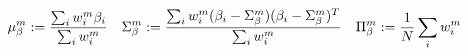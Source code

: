 

\begin{equation}
    \mu_{\beta}^{m} := 
    \frac{
        \sum_{i}w_{i}^{m}\beta_{i}
    }
    {
        \sum_{i}w_{i}^{m}
    }
    \quad
    \Sigma_{\beta}^{m} :=
    \frac{
        \sum_{i}w_{i}^{m}
        (\beta_{i} - \Sigma_{\beta}^{m})
        (\beta_{i} - \Sigma_{\beta}^{m})^{T}
    }
    {
        \sum_{i}w_{i}^{m}
    }
    \quad
    \Pi_{\beta}^{m} :=
    \frac{1}{N}\sum_{i}{w_{i}^{m}}
\end{equation}
